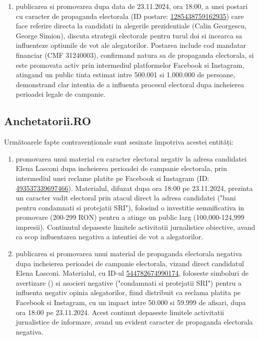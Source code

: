 \documentclass[a4paper,12pt]{article}
\begin{document}
\begin{enumerate}[leftmargin=*, label=\arabic*.)]
    \item publicarea si promovarea dupa data de 23.11.2024, ora 18:00, a unei postari cu caracter de propaganda electorala (ID postare: \href{https://www.facebook.com/ads/library/?id=1285438759162935}{1285438759162935}) care face referire directa la candidati in alegerile prezidentiale (Calin Georgescu, George Simion), discuta strategii electorale pentru turul doi si incearca sa influenteze optiunile de vot ale alegatorilor. Postarea include cod mandatar financiar (CMF 31240003), confirmand natura sa de propaganda electorala, si este promovata activ prin intermediul platformelor Facebook si Instagram, atingand un public tinta estimat intre 500.001 si 1.000.000 de persoane, demonstrand clar intentia de a influenta procesul electoral dupa incheierea perioadei legale de campanie.
\end{enumerate}

\vspace{0.5cm}

\subsection{Anchetatorii.RO}
Următoarele fapte contravenționale sunt sesizate împotriva acestei entități:

\begin{enumerate}[leftmargin=*, label=\arabic*.)]
    \item promovarea unui material cu caracter electoral negativ la adresa candidatei Elena Lasconi dupa incheierea perioadei de campanie electorala, prin intermediul unei reclame platite pe Facebook si Instagram (ID: \href{https://www.facebook.com/ads/library/?id=493537339697466}{493537339697466}). Materialul, difuzat dupa ora 18:00 pe 23.11.2024, prezinta un caracter vadit electoral prin atacul direct la adresa candidatei ("bani pentru condamnati si protejatii SRI"), folosind o investitie semnificativa in promovare (200-299 RON) pentru a atinge un public larg (100,000-124,999 impresii). Continutul depaseste limitele activitatii jurnalistice obiective, avand ca scop influentarea negativa a intentiei de vot a alegatorilor.
    \item publicarea si promovarea unui material de propaganda electorala negativa dupa incheierea perioadei de campanie electorala, vizand direct candidatul Elena Lasconi. Materialul, cu ID-ul \href{https://www.facebook.com/ads/library/?id=544782674990174}{544782674990174}, foloseste simboluri de avertizare () si asocieri negative ("condamnati si protejatii SRI") pentru a influenta negativ opinia alegatorilor, fiind distribuit ca reclama platita pe Facebook si Instagram, cu un impact intre 50.000 si 59.999 de afisari, dupa ora 18:00 pe 23.11.2024. Acest continut depaseste limitele activitatii jurnalistice de informare, avand un evident caracter de propaganda electorala negativa.
\end{enumerate}
\end{document}

